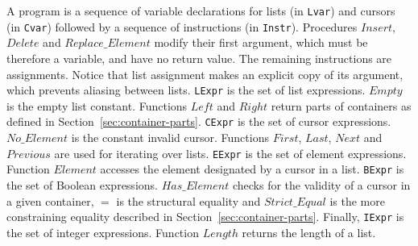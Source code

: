 \documentclass[runningheads,a4paper]{llncs}
\newcommand{\Insert}{\ensuremath{\mathit{Insert}}\xspace}
\newcommand{\Delete}{\ensuremath{\mathit{Delete}}\xspace}
\newcommand{\Replace}{\ensuremath{\mathit{Replace\_Element}}\xspace}
\newcommand{\Next}{\ensuremath{\mathit{Next}}\xspace}
\newcommand{\Previous}{\ensuremath{\mathit{Previous}}\xspace}
\newcommand{\First}{\ensuremath{\mathit{First}}\xspace}
\newcommand{\Last}{\ensuremath{\mathit{Last}}\xspace}
\newcommand{\Left}{\ensuremath{\mathit{Left}}\xspace}
\newcommand{\Right}{\ensuremath{\mathit{Right}}\xspace}
\newcommand{\Element}{\ensuremath{\mathit{Element}}\xspace}
\newcommand{\HasElement}{\ensuremath{\mathit{Has\_Element}}\xspace}
\newcommand{\StrictEqual}{\ensuremath{\mathit{Strict\_Equal}}\xspace}
\newcommand{\Empty}{\ensuremath{\mathit{Empty}}\xspace}
\newcommand{\NoElement}{\ensuremath{\mathit{No\_Element}}\xspace}
\newcommand{\Length}{\ensuremath{\mathit{Length}}\xspace}
\begin{document}
A program is a sequence of variable declarations for lists (in \texttt{Lvar})
and cursors (in \texttt{Cvar}) followed by a sequence of instructions (in
\texttt{Instr}). Procedures $\Insert$, $\Delete$ and $\Replace$ modify their
first argument, which must be therefore a variable, and have no return
value. The remaining instructions are assignments. Notice that list assignment
makes an explicit copy of its argument, which prevents aliasing between
lists. \texttt{LExpr} is the set of list expressions. $\Empty$ is the empty
list constant. Functions $\Left$ and $\Right$ return parts of containers as
defined in Section~\ref{sec:container-parts}. \texttt{CExpr} is the set of
cursor expressions. \NoElement is the constant invalid cursor.  Functions
$\First$, $\Last$, $\Next$ and $\Previous$ are used for iterating over
lists. \texttt{EExpr} is the set of element expressions. Function $\Element$
accesses the element designated by a cursor in a list. \texttt{BExpr} is the
set of Boolean expressions. $\HasElement$ checks for the validity of a cursor
in a given container, $=$ is the structural equality and $\StrictEqual$ is the
more constraining equality described in
Section~\ref{sec:container-parts}. Finally, \texttt{IExpr} is the set of
integer expressions. Function $\Length$ returns the length of a list.
\end{document}
